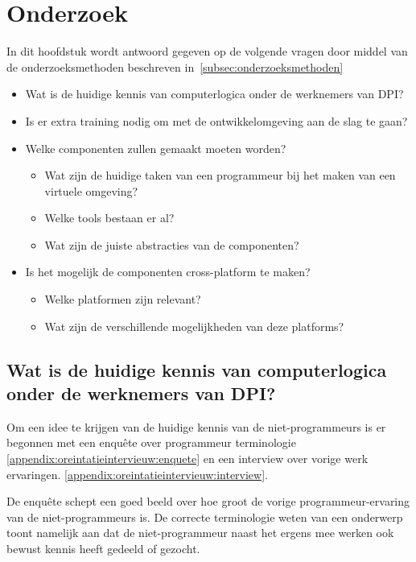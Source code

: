 \chapter{Onderzoek}
\label{ch:onderzoek}

In dit hoofdstuk wordt antwoord gegeven op de volgende vragen door middel van de onderzoeksmethoden beschreven in~\ref{subsec:onderzoeksmethoden}

\begin{itemize}
\item Wat is de huidige kennis van computerlogica onder de werknemers van DPI?
\item Is er extra training nodig om met de ontwikkelomgeving aan de slag te gaan?
\item Welke componenten zullen gemaakt moeten worden?
	\begin{itemize}
	\item Wat zijn de huidige taken van een programmeur bij het maken van een virtuele omgeving?
	\item Welke tools bestaan er al?
	\item Wat zijn de juiste abstracties van de componenten? 
	\end{itemize}
\item Is het mogelijk de componenten cross-platform te maken?
	\begin{itemize}
	\item Welke platformen zijn relevant?
	\item Wat zijn de verschillende mogelijkheden van deze platforms?
	\end{itemize}
\end{itemize}

\section{Wat is de huidige kennis van computerlogica onder de werknemers van DPI?}
Om een idee te krijgen van de huidige kennis van de niet-programmeurs is er begonnen met een enquête over programmeur terminologie \ref{appendix:oreintatieintervieuw:enquete} en een interview over vorige werk ervaringen. \ref{appendix:oreintatieintervieuw:interview}. 

De enquête schept een goed beeld over hoe groot de vorige programmeur-ervaring van de niet-programmeurs is. De correcte terminologie weten van een onderwerp toont namelijk aan dat de niet-programmeur naast het ergens mee werken ook bewust kennis heeft gedeeld of gezocht.

